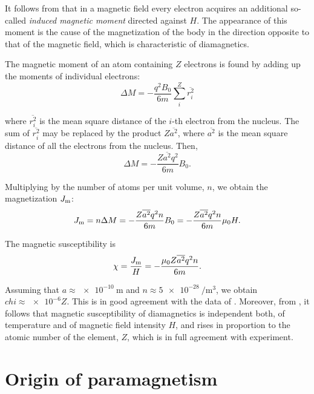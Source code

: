 It follows from  that in a magnetic field every electron acquires an additional so-called \textit{induced magnetic moment} directed against $H$. The appearance of this moment is the cause of the magnetization of the body in the direction opposite to that of the magnetic field, which is characteristic of diamagnetics.

The magnetic moment of an atom containing $Z$ electrons is found by adding up the moments of individual electrons:
\begin{equation}\label{eq:7_41}
    \Delta{M} = - \frac{q^2 B_0}{6 m} \sum_i^Z \overline{r^2_i}
\end{equation}

\noindent
where $\overline{r^2_i}$ is the mean square distance of the $i$-th electron from the nucleus. The sum of $\overline{r^2_i}$ may be replaced by the product $Z\overline{a^2}$, where $\overline{a^2}$ is the mean square distance of all the electrons from the nucleus. Then,
\begin{equation}\label{eq:7_42}
    \Delta{M} = - \frac{Z \overline{a^2} q^2}{6 m} B_0.
\end{equation}

\noindent
Multiplying  by the number of atoms per unit volume, $n$, we obtain the magnetization $J_{\text{m}}$:
\begin{equation}\label{eq:7_43}
    J_{\text{m}} = n \Delta{M} = - \frac{Z \overline{a^2} q^2 n}{6 m} B_0 = - \frac{Z \overline{a^2} q^2 n}{6 m} \mu_0 H.
\end{equation}

The magnetic susceptibility is
\begin{equation}\label{eq:7_44}
    \chi = \frac{J_{\text{m}}}{H} = - \frac{\mu_0 Z \overline{a^2} q^2 n}{6 m}.
\end{equation}

\noindent
Assuming that $a\approx\SI{e-10}{\metre}$ and $n\approx\SI{5e-28}{\per\metre\cubed}$, we obtain $chi\approx\num{e-6}Z$. This is in good agreement with the data of . Moreover, from , it follows that magnetic susceptibility of diamagnetics is independent both, of temperature and of magnetic field intensity $H$, and rises in proportion to the atomic number of the element, $Z$, which is in full agreement with experiment.

\section{Origin of paramagnetism}\label{sec:67}


